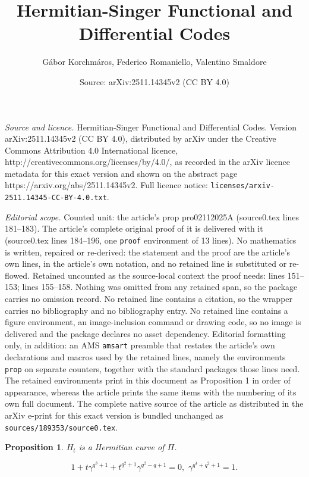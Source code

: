 \documentclass[10pt,a4paper]{amsart}
\title{Hermitian-Singer Functional and Differential Codes}
\author{G\'abor Korchm\'aros, Federico Romaniello, Valentino Smaldore}
\date{Source: arXiv:2511.14345v2 (CC BY 4.0)}
\newtheorem{prop}{Proposition}
\begin{document}
\maketitle

\noindent\emph{Source and licence.} Hermitian-Singer Functional and Differential Codes. Version arXiv:2511.14345v2 (CC BY 4.0), distributed by arXiv under the Creative Commons Attribution 4.0 International licence, http://creativecommons.org/licenses/by/4.0/, as recorded in the arXiv licence metadata for this exact version and shown on the abstract page https://arxiv.org/abs/2511.14345v2. Full licence notice: \texttt{licenses/arxiv-2511.14345-CC-BY-4.0.txt}.\par\smallskip

\noindent\textit{Editorial scope.} Counted unit: the article's prop pro02112025A (source0.tex lines 181--183). The article's complete original proof of it is delivered with it (source0.tex lines 184--196, one \texttt{proof} environment of 13 lines). No mathematics is written, repaired or re-derived: the statement and the proof are the article's own lines, in the article's own notation, and no retained line is substituted or re-flowed.  Retained uncounted as the source-local context the proof needs: lines 151--153; lines 155--158.  Nothing was omitted from any retained span, so the package carries no omission record.  No retained line contains a citation, so the wrapper carries no bibliography and no bibliography entry.  No retained line contains a figure environment, an image-inclusion command or drawing code, so no image is delivered and the package declares no asset dependency.  Editorial formatting only, in addition: an AMS \texttt{amsart} preamble that restates the article's own declarations and macros used by the retained lines, namely the environments \texttt{prop} on separate counters, together with the standard packages those lines need.  The retained environments print in this document as Proposition 1 in order of appearance, whereas the article prints the same items with the numbering of its own full document.  The complete native source of the article as distributed in the arXiv e-print for this exact version is bundled unchanged as \texttt{sources/189353/source0.tex}.
\begin{prop}
\label{pro30102025} $H_t$ is a Hermitian curve of $\Pi$.
\end{prop}

\begin{equation}
\label{eq30102025}
1+t\gamma^{q^3+1}+t^{q^2+1}\gamma^{q^2-q+1}=0,\,\, \gamma^{q^4+q^2+1}=1.
\end{equation}
\end{document}
